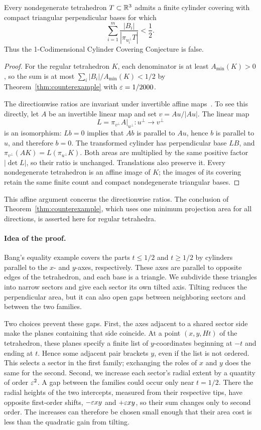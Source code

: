 \begin{corollary}\label{cor:normalized-covering}
Every nondegenerate tetrahedron $T\subset\mathbb R^3$ admits a finite cylinder
covering with compact triangular perpendicular bases for which
\[
 \sum_{i=1}^m\frac{|B_i|}{|\pi_{u_i^\perp}T|}<\frac12.
\]
Thus the 1-Codimensional Cylinder Covering Conjecture is false.
\end{corollary}
\begin{proof}
For the regular tetrahedron $K$, each denominator is at least
$A_{\min}(K)>0$, so the sum is at most
$\sum_i|B_i|/A_{\min}(K)<1/2$ by
Theorem~\ref{thm:counterexample} with $\varepsilon=1/2000$.

The directionwise ratios are invariant under invertible affine
maps~\cite[arXiv v1, Section~3]{BL2009}.
To see this directly, let $A$ be an invertible linear map and set
$v=Au/|Au|$. The linear map
\[
 L=\left.\pi_{v^\perp}A\right|_{u^\perp}:u^\perp\longrightarrow v^\perp
\]
is an isomorphism: $Lb=0$ implies that $Ab$ is parallel to $Au$,
hence $b$ is parallel to $u$, and therefore $b=0$.
The transformed cylinder has perpendicular base $LB$, and
$\pi_{v^\perp}(AK)=L(\pi_{u^\perp}K)$. Both areas are multiplied by
the same positive factor $|\det L|$, so their ratio is unchanged.
Translations also preserve it. Every nondegenerate tetrahedron is an
affine image of $K$; the images of its covering retain the same finite
count and compact nondegenerate triangular bases.
\end{proof}

This affine argument concerns the directionwise ratios. The conclusion
of Theorem~\ref{thm:counterexample}, which uses one minimum projection
area for all directions, is asserted here for regular tetrahedra.

\paragraph{Idea of the proof.}
Bang's equality example covers the parts $t\le1/2$ and $t\ge1/2$ by
cylinders parallel to the $x$- and $y$-axes, respectively. These axes
are parallel to opposite edges of the tetrahedron, and each base is a
triangle. We
subdivide these triangles into narrow sectors and give each sector its
own tilted axis. Tilting reduces the perpendicular area, but it can also
open gaps between neighboring sectors and between the two families.

Two choices prevent these gaps. First, the axes adjacent to a shared
sector side make the planes containing that side coincide. At a point
$(x,y,Ht)$ of the tetrahedron, these planes specify a finite list of
$y$-coordinates beginning at $-t$ and ending at $t$. Hence some adjacent
pair brackets $y$, even if the list is not ordered. This selects a sector
in the first family; exchanging the roles of $x$ and $y$ does the same
for the second. Second, we increase each sector's radial extent by a
quantity of order $\varepsilon^2$. A gap between the families could occur only
near $t=1/2$. There the radial heights of the two intercepts, measured
from their respective tips, have opposite first-order shifts, $-\varepsilon xy$ and $+\varepsilon xy$, so their sum changes only
to second order. The increases can therefore be chosen small enough
that their area cost is less than the quadratic gain from tilting.

